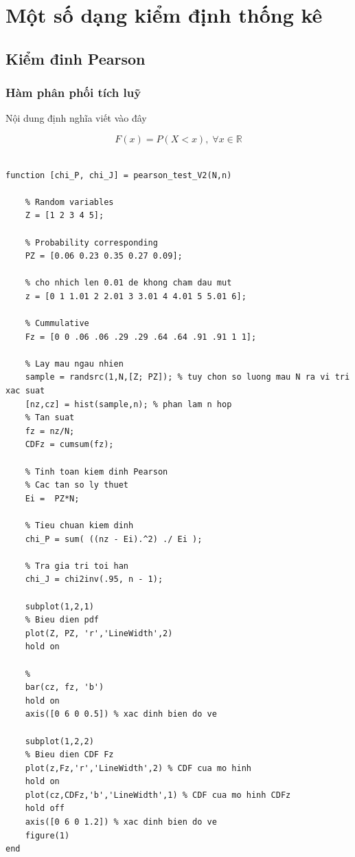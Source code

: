 \chapter{Một số dạng kiểm định thống kê}




\section{Kiểm đinh Pearson}
\subsection{Hàm phân phối tích luỹ}
\begin{dn}
 Nội dung định nghĩa viết vào đây
\end{dn}

\begin{equation}
    F(x) = P(X<x), \; \forall x \in \mathbb{R}
\end{equation}

\begin{matlab}
\begin{lstlisting}

function [chi_P, chi_J] = pearson_test_V2(N,n)

    % Random variables
    Z = [1 2 3 4 5];

    % Probability corresponding
    PZ = [0.06 0.23 0.35 0.27 0.09];

    % cho nhich len 0.01 de khong cham dau mut
    z = [0 1 1.01 2 2.01 3 3.01 4 4.01 5 5.01 6];

    % Cummulative
    Fz = [0 0 .06 .06 .29 .29 .64 .64 .91 .91 1 1];

    % Lay mau ngau nhien
    sample = randsrc(1,N,[Z; PZ]); % tuy chon so luong mau N ra vi tri xac suat 
    [nz,cz] = hist(sample,n); % phan lam n hop 
    % Tan suat
    fz = nz/N;
    CDFz = cumsum(fz);

    % Tinh toan kiem dinh Pearson
    % Cac tan so ly thuet
    Ei =  PZ*N;

    % Tieu chuan kiem dinh
    chi_P = sum( ((nz - Ei).^2) ./ Ei );

    % Tra gia tri toi han
    chi_J = chi2inv(.95, n - 1);

    subplot(1,2,1)
    % Bieu dien pdf
    plot(Z, PZ, 'r','LineWidth',2)
    hold on

    % 
    bar(cz, fz, 'b')
    hold on
    axis([0 6 0 0.5]) % xac dinh bien do ve

    subplot(1,2,2)
    % Bieu dien CDF Fz
    plot(z,Fz,'r','LineWidth',2) % CDF cua mo hinh
    hold on
    plot(cz,CDFz,'b','LineWidth',1) % CDF cua mo hinh CDFz
    hold off
    axis([0 6 0 1.2]) % xac dinh bien do ve
    figure(1)
end

\end{lstlisting}
\end{matlab}



